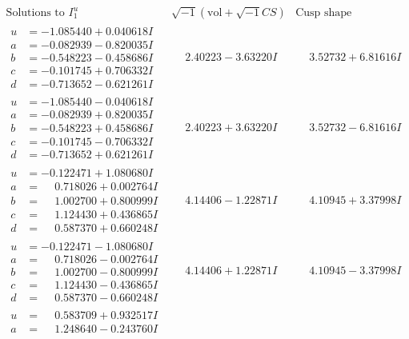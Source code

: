 \documentclass[1p]{elsarticle_modified}
\theoremstyle{definition}
\newcommand{\I}{\sqrt{-1}}
\begin{document}
$$\begin{array}{c|c|c}  
\text{Solutions to }I^u_{1}& \I (\text{vol} + \sqrt{-1}CS) & \text{Cusp shape}\\
 \hline 
\begin{aligned}
u &= -1.085440 + 0.040618 I \\
a &= -0.082939 - 0.820035 I \\
b &= -0.548223 - 0.458686 I \\
c &= -0.101745 + 0.706332 I \\
d &= -0.713652 - 0.621261 I\end{aligned}
 & \phantom{-}2.40223 - 3.63220 I & \phantom{-}3.52732 + 6.81616 I \\ \hline\begin{aligned}
u &= -1.085440 - 0.040618 I \\
a &= -0.082939 + 0.820035 I \\
b &= -0.548223 + 0.458686 I \\
c &= -0.101745 - 0.706332 I \\
d &= -0.713652 + 0.621261 I\end{aligned}
 & \phantom{-}2.40223 + 3.63220 I & \phantom{-}3.52732 - 6.81616 I \\ \hline\begin{aligned}
u &= -0.122471 + 1.080680 I \\
a &= \phantom{-}0.718026 + 0.002764 I \\
b &= \phantom{-}1.002700 + 0.800999 I \\
c &= \phantom{-}1.124430 + 0.436865 I \\
d &= \phantom{-}0.587370 + 0.660248 I\end{aligned}
 & \phantom{-}4.14406 - 1.22871 I & \phantom{-}4.10945 + 3.37998 I \\ \hline\begin{aligned}
u &= -0.122471 - 1.080680 I \\
a &= \phantom{-}0.718026 - 0.002764 I \\
b &= \phantom{-}1.002700 - 0.800999 I \\
c &= \phantom{-}1.124430 - 0.436865 I \\
d &= \phantom{-}0.587370 - 0.660248 I\end{aligned}
 & \phantom{-}4.14406 + 1.22871 I & \phantom{-}4.10945 - 3.37998 I \\ \hline\begin{aligned}
u &= \phantom{-}0.583709 + 0.932517 I \\
a &= \phantom{-}1.248640 - 0.243760 I \\

\end{aligned}
\end{array}$$
\end{document}
